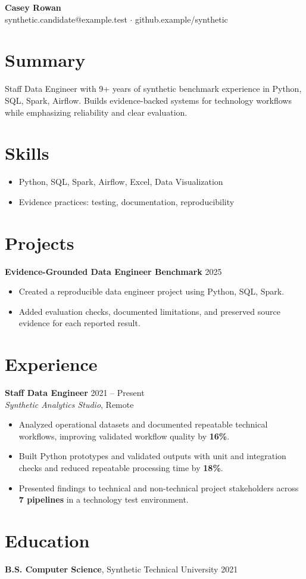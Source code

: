 \documentclass[10pt,letterpaper]{article}
\begin{document}
\begin{center}
{\Large \textbf{Casey Rowan}}\\
synthetic.candidate@example.test $\cdot$ github.example/synthetic
\end{center}

\section*{Summary}
Staff Data Engineer with 9+ years of synthetic benchmark experience in Python, SQL, Spark, Airflow. Builds evidence-backed systems for technology workflows while emphasizing reliability and clear evaluation.

\section*{Skills}
\begin{itemize}
  \item Python, SQL, Spark, Airflow, Excel, Data Visualization
  \item Evidence practices: testing, documentation, reproducibility
\end{itemize}

\section*{Projects}
\textbf{Evidence-Grounded Data Engineer Benchmark} \hfill 2025
\begin{itemize}
  \item Created a reproducible data engineer project using Python, SQL, Spark.
  \item Added evaluation checks, documented limitations, and preserved source evidence for each reported result.
\end{itemize}

\section*{Experience}
\textbf{Staff Data Engineer} \hfill 2021 -- Present\\
\textit{Synthetic Analytics Studio}, Remote
\begin{itemize}
  \item Analyzed operational datasets and documented repeatable technical workflows, improving validated workflow quality by \textbf{16\%}.
  \item Built Python prototypes and validated outputs with unit and integration checks and reduced repeatable processing time by \textbf{18\%}.
  \item Presented findings to technical and non-technical project stakeholders across \textbf{7 pipelines} in a technology test environment.
\end{itemize}

\section*{Education}
\textbf{B.S. Computer Science}, Synthetic Technical University \hfill 2021
\end{document}
